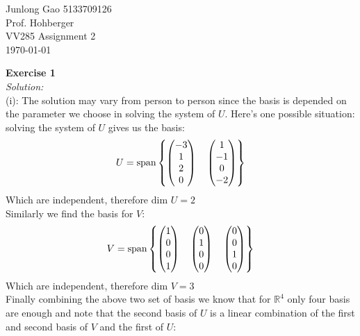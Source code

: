 \documentclass[12pt]{article}
\begin{document}
 
\begin{flushleft}
  Junlong Gao 5133709126\\ 
  Prof.  Hohberger\\ 
  VV285 Assignment 2\\
  \today 
\end{flushleft}

{\bf Exercise 1}\\
{\it Solution:}\\
(i): The solution may vary from person to person since the basis is depended on the parameter we choose in solving the system of $U$. Here's one possible situation: solving the system of $U$ gives us the basis:
\begin{align*}
U= {\rm span}\left\{
\begin{pmatrix}
-3 \\
1 \\
2 \\
0 \\
\end{pmatrix}
\quad
\begin{pmatrix}
1 \\
-1 \\
0 \\
-2
\end{pmatrix}
\right\}
\end{align*}
Which are independent, therefore dim $U=2$\\
Similarly we find the basis for $V$: 
\begin{align*}
V= {\rm span}\left\{
\begin{pmatrix}
1 \\
0 \\
0 \\
1 \\
\end{pmatrix}
\quad
\begin{pmatrix}
0 \\
1 \\
0 \\
0
\end{pmatrix}
\quad
\begin{pmatrix}
0 \\
0 \\
1 \\
0
\end{pmatrix}
\right\}
\end{align*}
Which are independent, therefore dim $V=3$\\
Finally combining the above two set of basis we know that for $\mathbb{R}^4$ only four basis are enough and note that the second basis of $U$ is a linear combination of the first and second basis of $V$ and the first of $U$:
\end{document}
